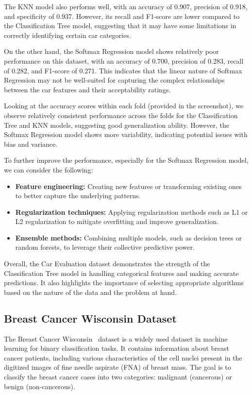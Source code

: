 \documentclass[letterpaper,10pt]{article}
\begin{document}
The KNN model also performs well, with an accuracy of 0.907, precision of 0.918, and specificity of 0.937. However, its recall and F1-score are lower compared to the Classification Tree model, suggesting that it may have some limitations in correctly identifying certain car categories.

On the other hand, the Softmax Regression model shows relatively poor performance on this dataset, with an accuracy of 0.700, precision of 0.283, recall of 0.282, and F1-score of 0.271. This indicates that the linear nature of Softmax Regression may not be well-suited for capturing the complex relationships between the car features and their acceptability ratings.

Looking at the accuracy scores within each fold (provided in the screenshot), we observe relatively consistent performance across the folds for the Classification Tree and KNN models, suggesting good generalization ability. However, the Softmax Regression model shows more variability, indicating potential issues with bias and variance.

To further improve the performance, especially for the Softmax Regression model, we can consider the following:

\begin{itemize}
    \item \textbf{Feature engineering:} Creating new features or transforming existing ones to better capture the underlying patterns.
    \item \textbf{Regularization techniques:} Applying regularization methods such as L1 or L2 regularization to mitigate overfitting and improve generalization.
    \item \textbf{Ensemble methods:} Combining multiple models, such as decision trees or random forests, to leverage their collective predictive power.
\end{itemize}

Overall, the Car Evaluation dataset demonstrates the strength of the Classification Tree model in handling categorical features and making accurate predictions. It also highlights the importance of selecting appropriate algorithms based on the nature of the data and the problem at hand.

\subsection{Breast Cancer Wisconsin Dataset}

The Breast Cancer Wisconsin~\cite{breastcancerdataset_wisconsion} dataset is a widely used dataset in machine learning for binary classification tasks. It contains information about breast cancer patients, including various characteristics of the cell nuclei present in the digitized images of fine needle aspirate (FNA) of breast mass. The goal is to classify the breast cancer cases into two categories: malignant (cancerous) or benign (non-cancerous).
\end{document}
